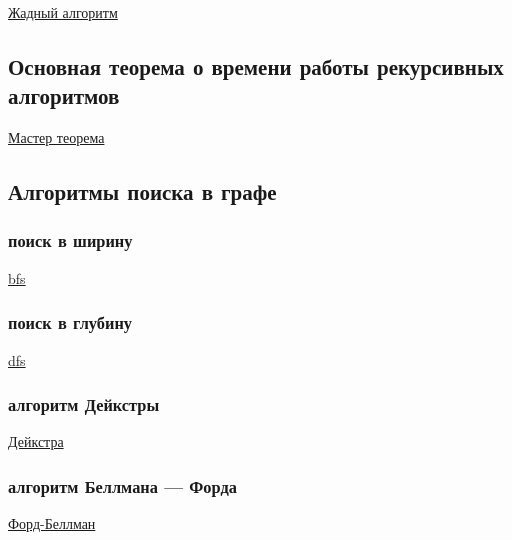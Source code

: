 \documentclass{article}
\begin{document}
\href{https://ru.wikipedia.org/wiki/%D0%96%D0%B0%D0%B4%D0%BD%D1%8B%D0%B9_%D0%B0%D0%BB%D0%B3%D0%BE%D1%80%D0%B8%D1%82%D0%BC}{Жадный алгоритм}

\subsection{ Основная теорема о времени работы рекурсивных алгоритмов}

\href{https://neerc.ifmo.ru/wiki/index.php?title=%D0%9C%D0%B0%D1%81%D1%82%D0%B5%D1%80-%D1%82%D0%B5%D0%BE%D1%80%D0%B5%D0%BC%D0%B0}{Мастер теорема}

\subsection{Алгоритмы поиска в графе }

\subsubsection{поиск в ширину}

\href{https://neerc.ifmo.ru/wiki/index.php?title=%D0%9E%D0%B1%D1%85%D0%BE%D0%B4_%D0%B2_%D1%88%D0%B8%D1%80%D0%B8%D0%BD%D1%83}{bfs}
\subsubsection{поиск в глубину}

\href{http://neerc.ifmo.ru/wiki/index.php?title=%D0%9E%D0%B1%D1%85%D0%BE%D0%B4_%D0%B2_%D0%B3%D0%BB%D1%83%D0%B1%D0%B8%D0%BD%D1%83,_%D1%86%D0%B2%D0%B5%D1%82%D0%B0_%D0%B2%D0%B5%D1%80%D1%88%D0%B8%D0%BD}{dfs}

\subsubsection{алгоритм Дейкстры}

\href{https://neerc.ifmo.ru/wiki/index.php?title=%D0%90%D0%BB%D0%B3%D0%BE%D1%80%D0%B8%D1%82%D0%BC_%D0%94%D0%B5%D0%B9%D0%BA%D1%81%D1%82%D1%80%D1%8B}{Дейкстра}

\subsubsection{алгоритм Беллмана — Форда}

\href{https://neerc.ifmo.ru/wiki/index.php?title=%D0%90%D0%BB%D0%B3%D0%BE%D1%80%D0%B8%D1%82%D0%BC_%D0%A4%D0%BE%D1%80%D0%B4%D0%B0-%D0%91%D0%B5%D0%BB%D0%BB%D0%BC%D0%B0%D0%BD%D0%B0}{Форд-Беллман}
\end{document}
